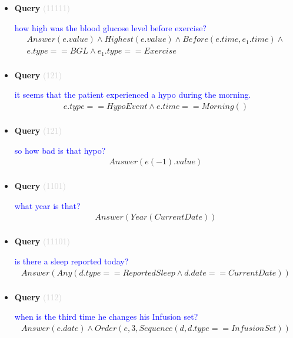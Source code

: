 \documentclass[11pt]{article}
\newcommand{\key}[1]{\textcolor{lightgray}{#1}}
\newcounter{CQuery}
\begin{document}
\begin{itemize}
\item
\textbf{Query\theCQuery} \key{(11111)} \addtocounter{CQuery}{1}
\textcolor{blue}{ how high was the blood glucose level before exercise? }
\begin{multline*}
Answer(e.value) \wedge Highest(e.value) \wedge Before(e.time, e_1.time) \wedge \\ 
e.type==BGL \wedge e_1.type==Exercise \\ 
\end{multline*}


\item
\textbf{Query\theCQuery} \key{(121)} \addtocounter{CQuery}{1}
\textcolor{blue}{ it seems that the patient experienced a hypo during the morning. }
\begin{multline*}
e.type==HypoEvent \wedge e.time==Morning() \\ 
\end{multline*}


\item
\textbf{Query\theCQuery} \key{(121)} \addtocounter{CQuery}{1}
\textcolor{blue}{ so how bad is that hypo? }
\begin{multline*}
Answer(e(-1).value) \\ 
\end{multline*}


\item
\textbf{Query\theCQuery} \key{(1101)} \addtocounter{CQuery}{1}
\textcolor{blue}{ what year is that? }
\begin{multline*}
Answer(Year(CurrentDate)) \\ 
\end{multline*}


\item
\textbf{Query\theCQuery} \key{(11101)} \addtocounter{CQuery}{1}
\textcolor{blue}{ is there a sleep reported today? }
\begin{multline*}
Answer(Any(d.type==ReportedSleep \wedge d.date==CurrentDate)) \\ 
\end{multline*}


\item
\textbf{Query\theCQuery} \key{(112)} \addtocounter{CQuery}{1}
\textcolor{blue}{ when is the third time he changes his Infusion set? }
\begin{multline*}
Answer(e.date) \wedge Order(e, 3, Sequence(d, d.type==InfusionSet)) \\ 
\end{multline*}



\end{itemize}
\end{document}
